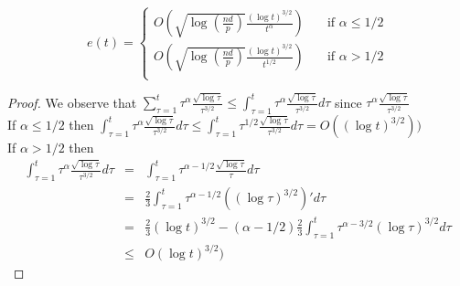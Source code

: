 \begin{lemma}
\[
e(t) =
     \begin{cases}
       O(\sqrt{\log(\frac{nd}{p})}\frac{(\log t)^{3/2}}{t^\alpha}) &\quad\text{if } \alpha \leq 1/2\\
       O(\sqrt{\log(\frac{nd}{p})}\frac{(\log t)^{3/2}}{t^{1/2}}) &\quad\text{if } \alpha > 1/2\\
       \end{cases}
\]

\end{lemma}
\begin{proof}
We observe that $\sum_{\tau=1}^t\tau^\alpha\frac{\sqrt{\log \tau}}{\tau^{3/2}} \leq \int_{\tau=1}^t \tau^\alpha\frac{\sqrt{\log \tau}}{\tau^{3/2}}d\tau$ since $\tau^\alpha\frac{\sqrt{\log \tau}}{\tau^{3/2}}$\\
If $\alpha\leq 1/2$ then $\int_{\tau=1}^t \tau^\alpha\frac{\sqrt{\log \tau}}{\tau^{3/2}}d\tau \leq \int_{\tau=1}^t \tau^{1/2}\frac{\sqrt{\log \tau}}{\tau^{3/2}}d\tau = O((\log t)^{3/2}))$\\

\noindent If $\alpha> 1/2$ then\\

\begin{eqnarray*}
\int_{\tau=1}^t \tau^\alpha\frac{\sqrt{\log \tau}}{\tau^{3/2}}d\tau &=& \int_{\tau=1}^t \tau^{\alpha-1/2}\frac{\sqrt{\log \tau}}{\tau}d\tau\\
&=& \frac{2}{3} \int_{\tau=1}^t \tau^{\alpha-1/2}((\log \tau)^{3/2})'d\tau\\
&=& \frac{2}{3}(\log t)^{3/2} - (\alpha-1/2)\frac{2}{3} \int_{\tau=1}^t \tau^{\alpha-3/2}(\log \tau)^{3/2}d\tau\\
&\leq& O(\log t)^{3/2})
\end{eqnarray*}


\end{proof}

